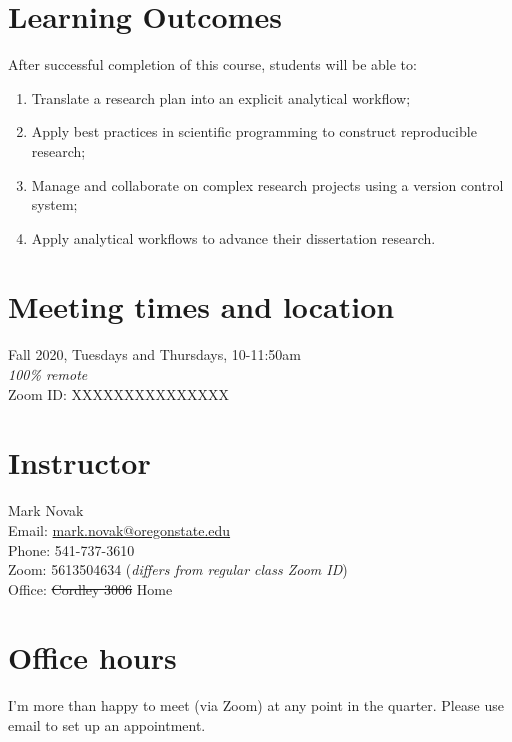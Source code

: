 \documentclass[10pt]{article}
\begin{document}
\section*{Learning Outcomes}
\noindent
After successful completion of this course, students will be able to:
\begin{enumerate}
	\itemsep0em 
	\item Translate a research plan into an explicit analytical workflow;
	\item Apply best practices in scientific programming to construct reproducible research;
	\item Manage and collaborate on complex research projects using a version control system;
	\item Apply analytical workflows to advance their dissertation research.
\end{enumerate}
	
\section*{Meeting times and location}
\noindent
	Fall 2020, Tuesdays and Thursdays, 10-11:50am\\
	\emph{100\% remote}\\
	Zoom ID:  XXXXXXXXXXXXXXX

\section*{Instructor}
\noindent
	Mark Novak\\
	Email: \href{mailto:mark.novak@oregonstate.edu}{mark.novak@oregonstate.edu}\\
	Phone: 541-737-3610\\
	Zoom:  5613504634 (\emph{differs from regular class Zoom ID})\\
	Office: \st{Cordley 3006} Home

\section*{Office hours}
\noindent
	I'm more than happy to meet (via Zoom) at any point in the quarter.
	Please use email to set up an appointment. 
\end{document}
